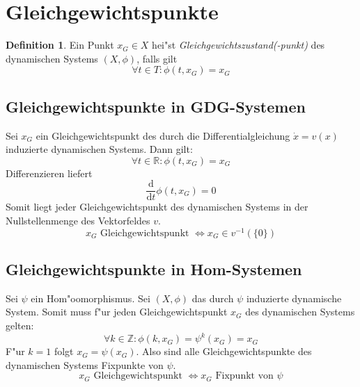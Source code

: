 \documentclass[a4paper, 13pt]{scrreprt}
\theoremstyle{definition} \newtheorem{definition}{Definition}[section]
\begin{document}
\section{Gleichgewichtspunkte}
\begin{definition}
Ein Punkt $x_G \in X$ hei"st \emph{Gleichgewichtszustand(-punkt)} des dynamischen Systems $(X,\phi)$, falls gilt
$$ \forall t \in T: \phi(t, x_G) = x_G$$
\end{definition}

\subsection{Gleichgewichtspunkte in GDG-Systemen}
Sei $x_G$ ein Gleichgewichtspunkt des durch die Differentialgleichung $\dot x = v(x)$ induzierte dynamischen Systems. Dann gilt:
$$ \forall t\in \mathbb{R}: \phi(t, x_G) = x_G $$
Differenzieren liefert 
$$ \frac{\mathrm d}{\mathrm dt} \phi(t, x_G) = 0 $$
Somit liegt jeder Gleichgewichtspunkt des dynamischen Systems in der Nullstellenmenge des Vektorfeldes $v$.
$$ x_G \mbox{ Gleichgewichtspunkt } \Leftrightarrow x_G \in v^{-1}(\{0\}) $$

\subsection{Gleichgewichtspunkte in Hom-Systemen}
Sei $\psi$ ein Hom"oomorphismus. Sei $(X, \phi)$ das durch $\psi$ induzierte dynamische System. Somit muss f"ur jeden Gleichgewichtspunkt $x_G$ des dynamischen Systems gelten:
$$ \forall k\in\mathbb{Z}: \phi(k, x_G) = \psi^k(x_G) = x_G$$
F"ur $k=1$ folgt $x_G= \psi(x_G)$. Also sind alle Gleichgewichtspunkte des dynamischen Systems Fixpunkte von $\psi$. 
$$ x_G \mbox{ Gleichgewichtspunkt } \Leftrightarrow x_G \mbox{ Fixpunkt von } \psi $$
\end{document}
